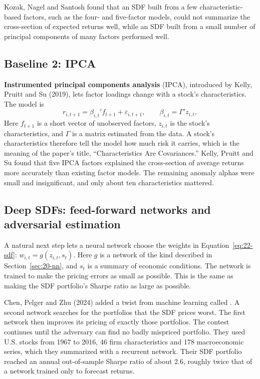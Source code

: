 Kozak, Nagel and Santosh found that an SDF built from a few characteristic-based factors, such as the four- and five-factor models, could not summarize the cross-section of expected returns well, while an SDF built from a small number of principal components of many factors performed well.

\subsection{Baseline 2: IPCA}

\textbf{Instrumented principal components analysis} (IPCA), introduced by Kelly, Pruitt and Su (2019), lets factor loadings change with a stock's characteristics. The model is
\begin{equation}
  r_{i,t+1} = \beta_{i,t}' f_{t+1} + \varepsilon_{i,t+1}, \qquad \beta_{i,t} = \Gamma' z_{i,t},
  \label{eq:22-ipca}
\end{equation}
Here $f_{t+1}$ is a short vector of unobserved factors, $z_{i,t}$ is the stock's characteristics, and $\Gamma$ is a matrix estimated from the data. A stock's characteristics therefore tell the model how much risk it carries, which is the meaning of the paper's title, ``Characteristics Are Covariances.'' Kelly, Pruitt and Su found that five IPCA factors explained the cross-section of average returns more accurately than existing factor models. The remaining anomaly alphas were small and insignificant, and only about ten characteristics mattered.

\subsection{Deep SDFs: feed-forward networks and adversarial estimation}

A natural next step lets a neural network choose the weights in Equation~\eqref{eq:22-sdf}: $w_{i,t} = g(z_{i,t}, s_t)$. Here $g$ is a network of the kind described in Section~\ref{sec:20-nn}, and $s_t$ is a summary of economic conditions. The network is trained to make the pricing errors as small as possible. This is the same as making the SDF portfolio's Sharpe ratio as large as possible.

Chen, Pelger and Zhu (2024) added a twist from machine learning called . A second network searches for the portfolios that the SDF prices worst. The first network then improves its pricing of exactly those portfolios. The contest continues until the adversary can find no badly mispriced portfolio. They used U.S. stocks from 1967 to 2016, 46 firm characteristics and 178 macroeconomic series, which they summarized with a recurrent network. Their SDF portfolio reached an annual out-of-sample Sharpe ratio of about 2.6, roughly twice that of a network trained only to forecast returns.

